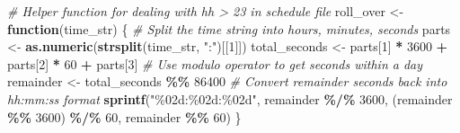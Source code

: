 \documentclass[
  12pt,
]{article}
\newenvironment{Shaded}{\begin{snugshade}}{\end{snugshade}}
\newcommand{\CommentTok}[1]{\textcolor[rgb]{0.56,0.35,0.01}{\textit{#1}}}
\newcommand{\ControlFlowTok}[1]{\textcolor[rgb]{0.13,0.29,0.53}{\textbf{#1}}}
\newcommand{\DecValTok}[1]{\textcolor[rgb]{0.00,0.00,0.81}{#1}}
\newcommand{\FunctionTok}[1]{\textcolor[rgb]{0.13,0.29,0.53}{\textbf{#1}}}
\newcommand{\NormalTok}[1]{#1}
\newcommand{\OtherTok}[1]{\textcolor[rgb]{0.56,0.35,0.01}{#1}}
\newcommand{\SpecialCharTok}[1]{\textcolor[rgb]{0.81,0.36,0.00}{\textbf{#1}}}
\newcommand{\StringTok}[1]{\textcolor[rgb]{0.31,0.60,0.02}{#1}}
\begin{document}
\begin{Shaded}
\begin{Highlighting}[]
\CommentTok{\# Helper function for dealing with hh \textgreater{} 23 in schedule file}
\NormalTok{roll\_over }\OtherTok{\textless{}{-}} \ControlFlowTok{function}\NormalTok{(time\_str) \{}
  \CommentTok{\# Split the time string into hours, minutes, seconds}
\NormalTok{  parts }\OtherTok{\textless{}{-}} \FunctionTok{as.numeric}\NormalTok{(}\FunctionTok{strsplit}\NormalTok{(time\_str, }\StringTok{":"}\NormalTok{)[[}\DecValTok{1}\NormalTok{]])}
\NormalTok{  total\_seconds }\OtherTok{\textless{}{-}}\NormalTok{ parts[}\DecValTok{1}\NormalTok{] }\SpecialCharTok{*} \DecValTok{3600} \SpecialCharTok{+}\NormalTok{ parts[}\DecValTok{2}\NormalTok{] }\SpecialCharTok{*} \DecValTok{60} \SpecialCharTok{+}\NormalTok{ parts[}\DecValTok{3}\NormalTok{]}
  \CommentTok{\# Use modulo operator to get seconds within a day}
\NormalTok{  remainder }\OtherTok{\textless{}{-}}\NormalTok{ total\_seconds }\SpecialCharTok{\%\%} \DecValTok{86400}
  \CommentTok{\# Convert remainder seconds back into hh:mm:ss format}
  \FunctionTok{sprintf}\NormalTok{(}\StringTok{"\%02d:\%02d:\%02d"}\NormalTok{, }
\NormalTok{          remainder }\SpecialCharTok{\%/\%} \DecValTok{3600}\NormalTok{, }
\NormalTok{          (remainder }\SpecialCharTok{\%\%} \DecValTok{3600}\NormalTok{) }\SpecialCharTok{\%/\%} \DecValTok{60}\NormalTok{, }
\NormalTok{          remainder }\SpecialCharTok{\%\%} \DecValTok{60}\NormalTok{)}
\NormalTok{\}}
\end{Highlighting}
\end{Shaded}
\end{document}
